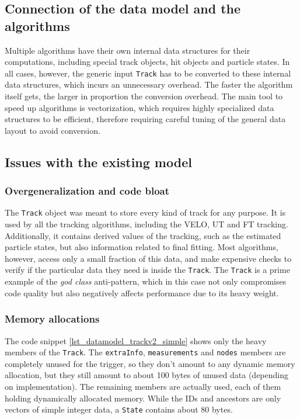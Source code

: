 \documentclass[12pt]{article}
\newcommand{\code}[1]{\texttt{#1}}
\begin{document}
\subsection{Connection of the data model and the algorithms}

Multiple algorithms have their own internal data structures for their computations, including special track objects, hit objects and particle states. In all cases, however, the generic input \code{Track} has to be converted to these internal data structures, which incurs an unnecessary overhead. The faster the algorithm itself gets, the larger in proportion the conversion overhead. The main tool to speed up algorithms is vectorization, which requires highly specialized data structures to be efficient, therefore requiring careful tuning of the general data layout to avoid conversion.

\subsection{Issues with the existing model}\label{sec_datamodel_issues}

\subsubsection{Overgeneralization and code bloat}

The \code{Track} object was meant to store every kind of track for any purpose. It is used by all the tracking algorithms, including the VELO, UT and FT tracking. Additionally, it contains derived values of the tracking, such as the estimated particle states, but also information related to final fitting. Most algorithms, however, access only a small fraction of this data, and make expensive checks to verify if the particular data they need is inside the \code{Track}. The \code{Track} is a prime example of the \textit{god class} anti-pattern, which in this case not only compromises code quality but also negatively affects performance due to its heavy weight.

\subsubsection{Memory allocations}

The code snippet \ref{lst_datamodel_trackv2_simple} shows only the heavy members of the \code{Track}. The \code{extraInfo}, \code{measurements} and \code{nodes} members are completely unused for the trigger, so they don't amount to any dynamic memory allocation, but they still amount to about 100 bytes of unused data (depending on implementation). The remaining members are actually used, each of them holding dynamically allocated memory. While the IDs and ancestors are only vectors of simple integer data, a \code{State} contains about 80 bytes.
\end{document}
